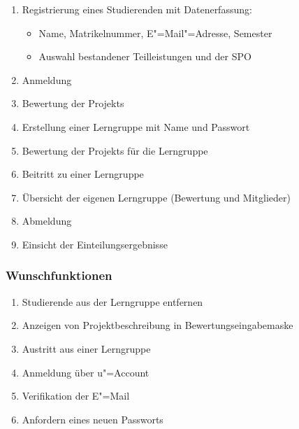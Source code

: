 \documentclass[parskip=full]{scrartcl}
\newcommand{\swtLabel}[1]{\textbf{/#1\arabic*0/}}
\begin{document}
\begin{enumerate}[label=\swtLabel{FA}]
  \item Registrierung eines Studierenden mit Datenerfassung:
  \label{FAregistrierung}
  \begin{itemize}
    \item Name, Matrikelnummer, E"=Mail"=Adresse, Semester %
    \item Auswahl bestandener Teilleistungen und der \gls{SPO}
  \end{itemize}
  \item Anmeldung \label{FAStudanmeldung}
  \item Bewertung der \glspl{Projekt} \label{FAbewertung}
  \item Erstellung einer Lerngruppe mit Name und Passwort \label{FAcreatelerng}
  \item Bewertung der \glspl{Projekt} für die Lerngruppe  \label{FAbewertung2}
  \item Beitritt zu einer Lerngruppe \label{FAjoinLerng}
  \item Übersicht der eigenen Lerngruppe (Bewertung und Mitglieder)
  \label{FAcheckLerng}
  \item Abmeldung \label{FAStudabmeldung}
  \item Einsicht der Einteilungsergebnisse \label{FAStudeinsicht}
\end{enumerate}

\subsubsection{Wunschfunktionen}

\begin{enumerate}[label=\swtLabel{FA}, resume]
	\item Studierende aus der Lerngruppe entfernen \label{FAentfStudLerng}
	\item Anzeigen von Projektbeschreibung in Bewertungseingabemaske
	\label{FAbeschreibung-Bewertung}
	\item Austritt aus einer Lerngruppe \label{FAlergAustritt}
	\item Anmeldung über u"=Account \label{FAstudUanmeldung}%
	\item Verifikation der E"=Mail \label{FAemailverifikation}%
	\item Anfordern eines neuen Passworts \label{FApasswortvergessen}
\end{enumerate}
\end{document}
